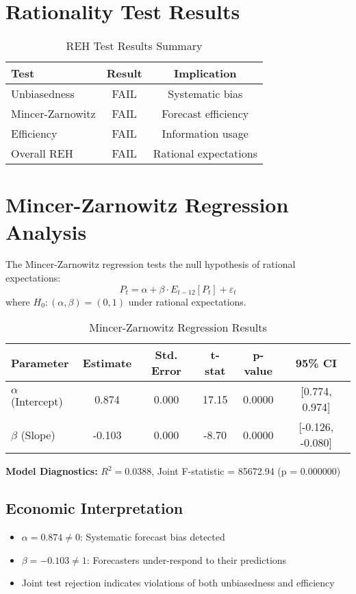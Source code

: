\documentclass[11pt,a4paper]{article}
\begin{document}
\section{Rationality Test Results}

\begin{table}[H]
\centering
\caption{REH Test Results Summary}
\begin{tabular}{lcc}
\toprule
\textbf{Test} & \textbf{Result} & \textbf{Implication} \\
\midrule
Unbiasedness & \textcolor{academicred}{FAIL} & Systematic bias \\
Mincer-Zarnowitz & \textcolor{academicred}{FAIL} & Forecast efficiency \\
Efficiency & \textcolor{academicred}{FAIL} & Information usage \\
Overall REH & \textcolor{academicred}{FAIL} & Rational expectations \\
\bottomrule
\end{tabular}
\end{table}

\section{Mincer-Zarnowitz Regression Analysis}

The Mincer-Zarnowitz regression tests the null hypothesis of rational expectations:
\begin{equation}
P_t = \alpha + \beta \cdot E_{t-12}[P_t] + \varepsilon_t
\end{equation}
where $H_0: (\alpha, \beta) = (0, 1)$ under rational expectations.

\begin{table}[H]
\centering
\caption{Mincer-Zarnowitz Regression Results}
\begin{tabular}{lccccc}
\toprule
\textbf{Parameter} & \textbf{Estimate} & \textbf{Std. Error} & \textbf{t-stat} & \textbf{p-value} & \textbf{95\% CI} \\
\midrule
$\alpha$ (Intercept) & 0.874 & 0.000 & 17.15 & 0.0000 & [0.774, 0.974] \\
$\beta$ (Slope) & -0.103 & 0.000 & -8.70 & 0.0000 & [-0.126, -0.080] \\
\bottomrule
\end{tabular}
\end{table}

\textbf{Model Diagnostics:} $R^2 = 0.0388$, Joint F-statistic = 85672.94 (p = 0.000000)

\subsection{Economic Interpretation}
\begin{itemize}
\item $\alpha = 0.874 \neq 0$: Systematic forecast bias detected
\item $\beta = -0.103 \neq 1$: Forecasters under-respond to their predictions
\item Joint test rejection indicates violations of both unbiasedness and efficiency
\end{itemize}
\end{document}
